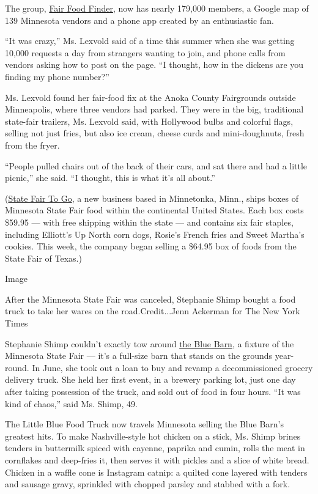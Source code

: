 The group,
\href{https://www.facebookcorewwwi.onion/groups/245420266734458}{Fair
Food Finder}, now has nearly 179,000 members, a Google map of 139
Minnesota vendors and a phone app created by an enthusiastic fan.

``It was crazy,'' Ms. Lexvold said of a time this summer when she was
getting 10,000 requests a day from strangers wanting to join, and phone
calls from vendors asking how to post on the page. ``I thought, how in
the dickens are you finding my phone number?''

Ms. Lexvold found her fair-food fix at the Anoka County Fairgrounds
outside Minneapolis, where three vendors had parked. They were in the
big, traditional state-fair trailers, Ms. Lexvold said, with Hollywood
bulbs and colorful flags, selling not just fries, but also ice cream,
cheese curds and mini-doughnuts, fresh from the fryer.

``People pulled chairs out of the back of their cars, and sat there and
had a little picnic,'' she said. ``I thought, this is what it's all
about.''

(\href{https://www.statefairtogo.com/}{State Fair To Go}, a new business
based in Minnetonka, Minn., ships boxes of Minnesota State Fair food
within the continental United States. Each box costs \$59.95 --- with
free shipping within the state --- and contains six fair staples,
including Elliott's Up North corn dogs, Rosie's French fries and Sweet
Martha's cookies. This week, the company began selling a \$64.95 box of
foods from the State Fair of Texas.)

Image

After the Minnesota State Fair was canceled, Stephanie Shimp bought a
food truck to take her wares on the road.Credit...Jenn Ackerman for The
New York Times

Stephanie Shimp couldn't exactly tow around
\href{http://bluebarnmn.com/}{the Blue Barn}, a fixture of the Minnesota
State Fair --- it's a full-size barn that stands on the grounds
year-round. In June, she took out a loan to buy and revamp a
decommissioned grocery delivery truck. She held her first event, in a
brewery parking lot, just one day after taking possession of the truck,
and sold out of food in four hours. ``It was kind of chaos,'' said Ms.
Shimp, 49.

The Little Blue Food Truck now travels Minnesota selling the Blue Barn's
greatest hits. To make Nashville-style hot chicken on a stick, Ms. Shimp
brines tenders in buttermilk spiced with cayenne, paprika and cumin,
rolls the meat in cornflakes and deep-fries it, then serves it with
pickles and a slice of white bread. Chicken in a waffle cone is
Instagram catnip: a quilted cone layered with tenders and sausage gravy,
sprinkled with chopped parsley and stabbed with a fork.

